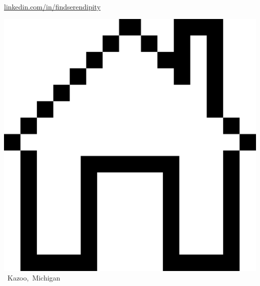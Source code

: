 \documentclass[10.5pt, oneside]{memoir}
\begin{document}
{\begin{minipage}[t][1in][b]{6in}
{            \href{https://www.linkedin.com/in/findserendipity/}{linkedin.com/in/findserendipity}}

        \mbox{\includegraphics[scale=0.02]{home.png}
            {Kazoo, Michigan}}
    \end{minipage}}
\vskip15pt
\end{document}
